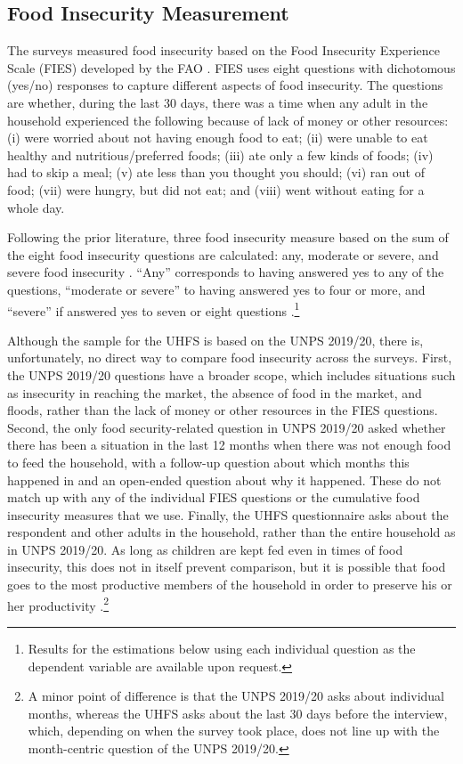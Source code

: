 \documentclass{wber}
\begin{document}
\subsection{Food Insecurity Measurement}\label{food-insecurity-measurement}

The surveys measured food insecurity based on the Food Insecurity
Experience Scale (FIES) developed by the FAO \citep{FAO2016}. FIES uses
eight questions with dichotomous (yes/no) responses to capture different
aspects of food insecurity. The questions are whether, during the last
30 days, there was a time when any adult in the household experienced
the following because of lack of money or other resources: (i) were
worried about not having enough food to eat; (ii) were unable to eat
healthy and nutritious/preferred foods; (iii) ate only a few kinds of
foods; (iv) had to skip a meal; (v) ate less than you thought you
should; (vi) ran out of food; (vii) were hungry, but did not eat; and
(viii) went without eating for a whole day.

Following the prior literature, three food insecurity measure based on
the sum of the eight food insecurity questions are calculated: any,
moderate or severe, and severe food insecurity
\citep{Kansiime2021, Wambogo2018, FAO2016}. ``Any'' corresponds to
having answered yes to any of the questions, ``moderate or severe'' to
having answered yes to four or more, and ``severe'' if answered yes to
seven or eight questions \citep{FAO2015, FAO2016}.\footnote{Results for
  the estimations below using each individual question as the dependent
  variable are available upon request.}

Although the sample for the UHFS is based on the UNPS 2019/20, there is,
unfortunately, no direct way to compare food insecurity across the
surveys. First, the UNPS 2019/20 questions have a broader scope, which
includes situations such as insecurity in reaching the market, the
absence of food in the market, and floods, rather than the lack of money
or other resources in the FIES questions. Second, the only food
security-related question in UNPS 2019/20 asked whether there has been a
situation in the last 12 months when there was not enough food to feed
the household, with a follow-up question about which months this
happened in and an open-ended question about why it happened. These do
not match up with any of the individual FIES questions or the cumulative
food insecurity measures that we use. Finally, the UHFS questionnaire
asks about the respondent and other adults in the household, rather than
the entire household as in UNPS 2019/20. As long as children are kept
fed even in times of food insecurity, this does not in itself prevent
comparison, but it is possible that food goes to the most productive
members of the household in order to preserve his or her productivity
\citep{Pitt1990}.\footnote{A minor point of difference is that the UNPS
  2019/20 asks about individual months, whereas the UHFS asks about the
  last 30 days before the interview, which, depending on when the survey
  took place, does not line up with the month-centric question of the
  UNPS 2019/20.}
\end{document}
